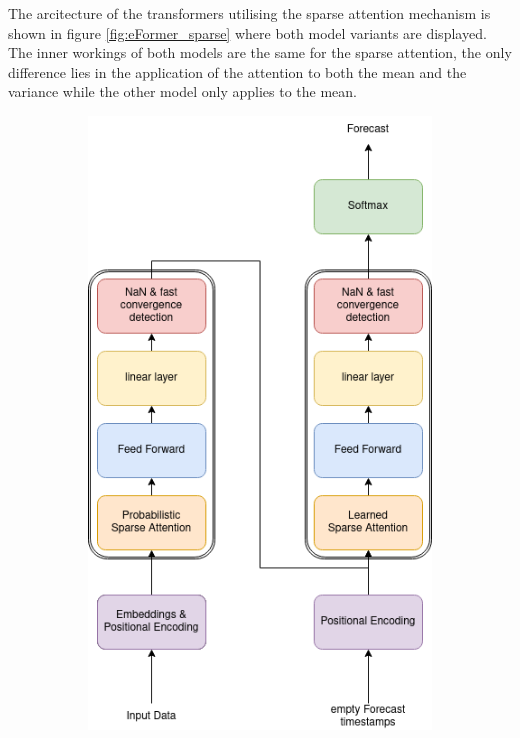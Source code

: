 \documentclass{article}
\begin{document}
The arcitecture of the transformers utilising the sparse attention mechanism is shown in figure \ref{fig:eFormer_sparse} where both model variants are displayed. The inner workings of both models are the same for the sparse attention, the only difference lies in the application of the attention to both the mean and the variance while the other model only applies to the mean.

\begin{figure}[!ht]
    \hspace*{\fill}
    \begin{subfigure}[b]{0.4\linewidth}
        \includegraphics[width=\linewidth]{graphs/models/eFormer_probSparse.png}

\end{subfigure}
\end{figure}
\end{document}
